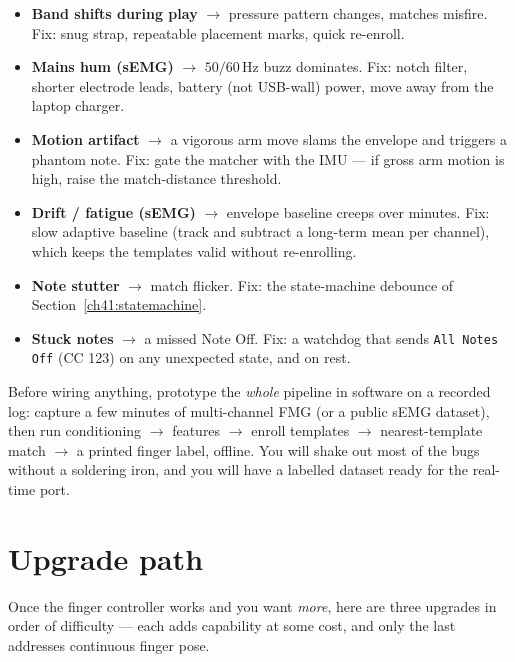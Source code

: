 \begin{itemize}
  \item \textbf{Band shifts during play} $\to$ pressure pattern changes, matches
        misfire. Fix: snug strap, repeatable placement marks, quick re-enroll.
  \item \textbf{Mains hum (sEMG)} $\to$ $50/60\,$Hz buzz dominates. Fix: notch
        filter, shorter electrode leads, battery (not USB-wall) power, move away
        from the laptop charger.
  \item \textbf{Motion artifact} $\to$ a vigorous arm move slams the envelope and
        triggers a phantom note. Fix: gate the matcher with the IMU --- if gross
        arm motion is high, raise the match-distance threshold.
  \item \textbf{Drift / fatigue (sEMG)} $\to$ envelope baseline creeps over
        minutes. Fix: slow adaptive baseline (track and subtract a long-term
        mean per channel), which keeps the templates valid without re-enrolling.
  \item \textbf{Note stutter} $\to$ match flicker. Fix: the state-machine
        debounce of Section~\ref{ch41:statemachine}.
  \item \textbf{Stuck notes} $\to$ a missed Note Off. Fix: a watchdog that sends
        \texttt{All Notes Off} (CC 123) on any unexpected state, and on rest.
\end{itemize}

\begin{labbox}
Before wiring anything, prototype the \emph{whole} pipeline in software on a
recorded log: capture a few minutes of multi-channel FMG (or a public sEMG
dataset), then run conditioning $\to$ features $\to$ enroll templates $\to$
nearest-template match $\to$ a printed finger label, offline. You will shake out
most of the bugs without a soldering iron, and you will have a labelled dataset
ready for the real-time port.
\end{labbox}

\section{Upgrade path}
\label{ch41:upgrade}

Once the finger controller works and you want \emph{more}, here are three
upgrades in order of difficulty --- each adds capability at some cost, and only
the last addresses continuous finger pose.

